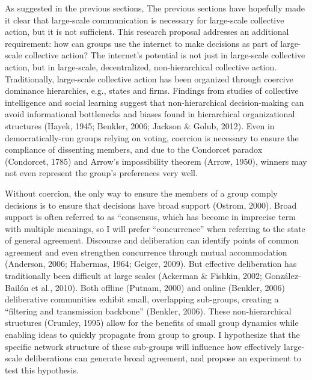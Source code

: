 As suggested in the previous sections, The previous sections have hopefully made it clear that large-scale communication is necessary for large-scale collective action, but it is not sufficient. This research proposal addresses an additional requirement: how can groups use the internet to make decisions as part of large-scale collective action? The internet’s potential is not just in large-scale collective action, but in large-scale, decentralized, non-hierarchical collective action. Traditionally, large-scale collective action has been organized through coercive dominance hierarchies, e.g., states and firms. Findings from studies of collective intelligence and social learning suggest that non-hierarchical decision-making can avoid informational bottlenecks and biases found in hierarchical organizational structures (Hayek, 1945; Benkler, 2006; Jackson \& Golub, 2012). Even in democratically-run groups relying on voting, coercion is necessary to ensure the compliance of dissenting members, and due to the Condorcet paradox (Condorcet, 1785) and Arrow’s impossibility theorem (Arrow, 1950), winners may not even represent the group’s preferences very well.

Without coercion, the only way to ensure the members of a group comply decisions is to ensure that decisions have broad support (Ostrom, 2000). Broad support is often referred to as ``consensus, which has become in imprecise term with multiple meanings, so I will prefer ``concurrence'' when referring to the state of general agreement. Discourse and deliberation can identify points of common agreement and even strengthen concurrence through mutual accommodation (Anderson, 2006; Habermas, 1964; Geiger, 2009). But effective deliberation has traditionally been difficult at large scales (Ackerman \& Fishkin, 2002; Gonz\'alez-Bail\'on et al., 2010). Both offline (Putnam, 2000) and online (Benkler, 2006) deliberative communities exhibit small, overlapping sub-groups, creating a ``filtering and transmission backbone'' (Benkler, 2006). These non-hierarchical structures (Crumley, 1995) allow for the benefits of small group dynamics while enabling ideas to quickly propagate from group to group. I hypothesize that the specific network structure of these sub-groups will influence how effectively large-scale deliberations can generate broad agreement, and propose an experiment to test this hypothesis.

